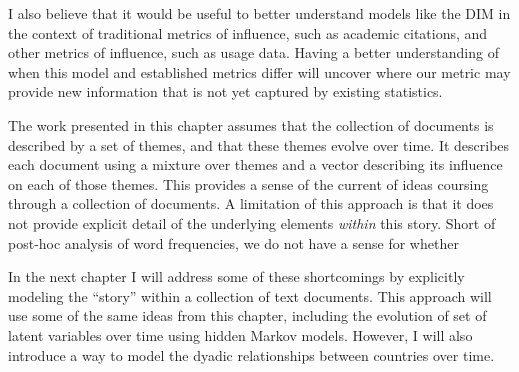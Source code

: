 I also believe that it would be useful to better understand models like
the DIM in the context of traditional metrics of influence, such as
academic citations, and other metrics of influence, such as usage
data.  Having a better understanding of when this model and
established metrics differ will uncover where our metric may provide
new information that is not yet captured by existing statistics.

The work presented in this chapter assumes that the collection of
documents is described by a set of themes, and that these themes
evolve over time.  It describes each document using a mixture over
themes and a vector describing its influence on each of those themes.
This provides a sense of the current of ideas coursing through a
collection of documents.  A limitation of this approach is that it does not
provide explicit detail of the underlying elements \emph{within} this
story.  Short of post-hoc analysis of word frequencies, we do not have a sense for whether

In the next chapter I will address some of these shortcomings by
explicitly modeling the ``story'' within a collection of text
documents.  This approach will use some of the same ideas from this
chapter, including the evolution of set of latent variables over time
using hidden Markov models.  However, I will also introduce a way to
model the dyadic relationships between countries over time.


